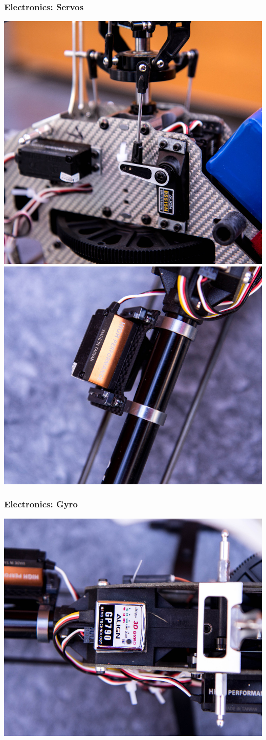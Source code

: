 \documentclass{beamer}
\begin{document}
\begin{frame}
\frametitle{Electronics: Servos}

\includegraphics[width=.5\textwidth]{images/IMG_0645_cropped_smaller}
\includegraphics[width=.5\textwidth]{images/IMG_0646_cropped_smaller}

\end{frame}

\begin{frame}
\frametitle{Electronics: Gyro}

\begin{center}
	\includegraphics[width=.7\textwidth]{images/IMG_0644_cropped_smaller}
\end{center}

\end{frame}

\end{document}
